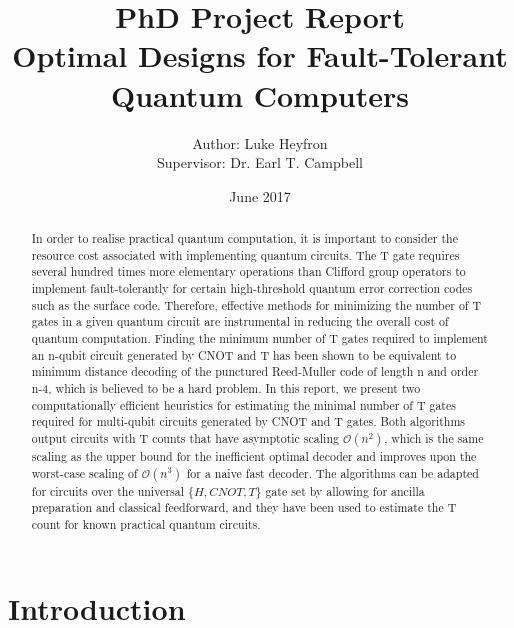\documentclass{article}
\title{PhD Project Report\\Optimal Designs for Fault-Tolerant Quantum Computers}
\author{Author: Luke Heyfron\\Supervisor: Dr. Earl T. Campbell}
\date{June 2017}
\theoremstyle{definition}
\theoremstyle{problem}
\theoremstyle{lemma}
\begin{document}
	\captionsetup{width=0.8\linewidth}
	\maketitle
	
	\begin{abstract}
		In order to realise practical quantum computation, it is important to consider the resource cost associated with implementing quantum circuits. The T gate requires several hundred times more elementary operations than Clifford group operators to implement fault-tolerantly for certain high-threshold quantum error correction codes such as the surface code. Therefore, effective methods for minimizing the number of T gates in a given quantum circuit are instrumental in reducing the overall cost of quantum computation. Finding the minimum number of T gates required to implement an n-qubit circuit generated by CNOT and T has been shown to be equivalent to minimum distance decoding of the punctured Reed-Muller code of length n and order n-4, which is believed to be a hard problem. In this report, we present two computationally efficient heuristics for estimating the
		minimal number of T gates required for multi-qubit circuits generated by CNOT and T gates. Both algorithms output circuits with T counts that have asymptotic scaling $\mathcal{O}(n^2)$, which is the same scaling as the upper bound for the inefficient optimal decoder and improves upon the worst-case scaling of $\mathcal{O}(n^3)$ for a naive fast decoder. The algorithms can be adapted for circuits over the universal $\{H,CNOT,T\}$ gate set by allowing for ancilla preparation and classical feedforward, and they have been used to estimate the T count for known practical quantum circuits.
	\end{abstract}
	
	\section{Introduction}
	
\end{document}
